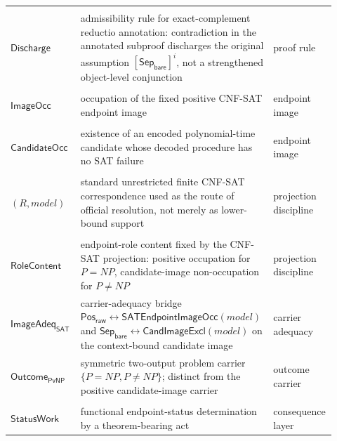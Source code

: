 \documentclass[11pt]{article}
\theoremstyle{definition}
\theoremstyle{remark}
\newcommand{\PosRaw}{\mathsf{Pos}_{\mathsf{raw}}}
\newcommand{\SepBare}{\mathsf{Sep}_{\mathsf{bare}}}
\newcommand{\CandImageExcl}{\mathsf{CandImageExcl}}
\newcommand{\SATEndpointImageOcc}{\mathsf{SATEndpointImageOcc}}
\newcommand{\OutcomePvNP}{\mathsf{Outcome}_{\mathsf{PvNP}}}
\newcommand{\ImageAdeq}{\mathsf{ImageAdeq}}
\begin{document}
\begin{longtable}{>{\raggedright\arraybackslash}p{0.21\linewidth}>{\raggedright\arraybackslash}p{0.54\linewidth}>{\raggedright\arraybackslash}p{0.17\linewidth}}
\begin{tabular}[t]{@{}l@{}}\(\mathsf{Annotation}\)\\\(\mathsf{Discharge}\)\end{tabular} & admissibility rule for exact-complement reductio annotation: contradiction in the annotated subproof discharges the original assumption \([\SepBare]^i\), not a strengthened object-level conjunction & proof rule \\
\begin{tabular}[t]{@{}l@{}}\(\mathsf{SATEndpoint}\)\\\(\mathsf{ImageOcc}\)\end{tabular} & occupation of the fixed positive CNF-SAT endpoint image & endpoint image \\
\begin{tabular}[t]{@{}l@{}}\(\mathsf{Positive}\)\\\(\mathsf{CandidateOcc}\)\end{tabular} & existence of an encoded polynomial-time candidate whose decoded procedure has no SAT failure & endpoint image \\
\begin{tabular}[t]{@{}l@{}}\(\mathsf{CNFRoute}\)\\\((R,model)\)\end{tabular} & standard unrestricted finite CNF-SAT correspondence used as the route of official resolution, not merely as lower-bound support & projection discipline \\
\begin{tabular}[t]{@{}l@{}}\(\mathsf{Projection}\)\\\(\mathsf{RoleContent}\)\end{tabular} & endpoint-role content fixed by the CNF-SAT projection: positive occupation for \(P=NP\), candidate-image non-occupation for \(P\neq NP\) & projection discipline \\
\(\ImageAdeq_{\mathsf{SAT}}\) & carrier-adequacy bridge \(\PosRaw\leftrightarrow\SATEndpointImageOcc(model)\) and \(\SepBare\leftrightarrow\CandImageExcl(model)\) on the context-bound candidate image & carrier adequacy \\
\(\OutcomePvNP\) & symmetric two-output problem carrier \(\{P=NP,P\neq NP\}\); distinct from the positive candidate-image carrier & outcome carrier \\
\begin{tabular}[t]{@{}l@{}}\(\mathsf{Endpoint}\)\\\(\mathsf{StatusWork}\)\end{tabular} & functional endpoint-status determination by a theorem-bearing act & consequence layer \\

\end{longtable}
\end{document}
